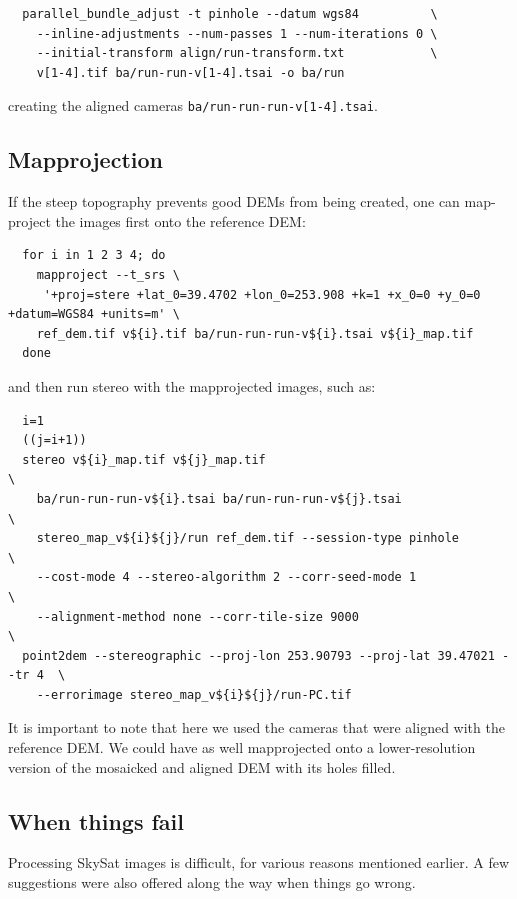 \begin{verbatim}
  parallel_bundle_adjust -t pinhole --datum wgs84          \
    --inline-adjustments --num-passes 1 --num-iterations 0 \
    --initial-transform align/run-transform.txt            \
    v[1-4].tif ba/run-run-v[1-4].tsai -o ba/run
\end{verbatim}

creating the aligned cameras \texttt{ba/run-run-run-v[1-4].tsai}.

\subsection{Mapprojection}

If the steep topography prevents good DEMs from being created, one can 
map-project the images first onto the reference DEM:

\begin{verbatim}
  for i in 1 2 3 4; do 
    mapproject --t_srs \
     '+proj=stere +lat_0=39.4702 +lon_0=253.908 +k=1 +x_0=0 +y_0=0 +datum=WGS84 +units=m' \
    ref_dem.tif v${i}.tif ba/run-run-run-v${i}.tsai v${i}_map.tif  
  done
\end{verbatim} %

and then run stereo with the mapprojected images, such as:

\begin{verbatim}
  i=1
  ((j=i+1))
  stereo v${i}_map.tif v${j}_map.tif                                         \
    ba/run-run-run-v${i}.tsai ba/run-run-run-v${j}.tsai                      \
    stereo_map_v${i}${j}/run ref_dem.tif --session-type pinhole              \
    --cost-mode 4 --stereo-algorithm 2 --corr-seed-mode 1                    \
    --alignment-method none --corr-tile-size 9000                            \
  point2dem --stereographic --proj-lon 253.90793 --proj-lat 39.47021 --tr 4  \
    --errorimage stereo_map_v${i}${j}/run-PC.tif
\end{verbatim}

It is important to note that here we used the cameras that were aligned
with the reference DEM. We could have as well mapprojected onto a
lower-resolution version of the mosaicked and aligned DEM with its holes
filled.

\subsection{When things fail}

Processing SkySat images is difficult, for various reasons mentioned
earlier. A few suggestions were also offered along the way when things
go wrong.


